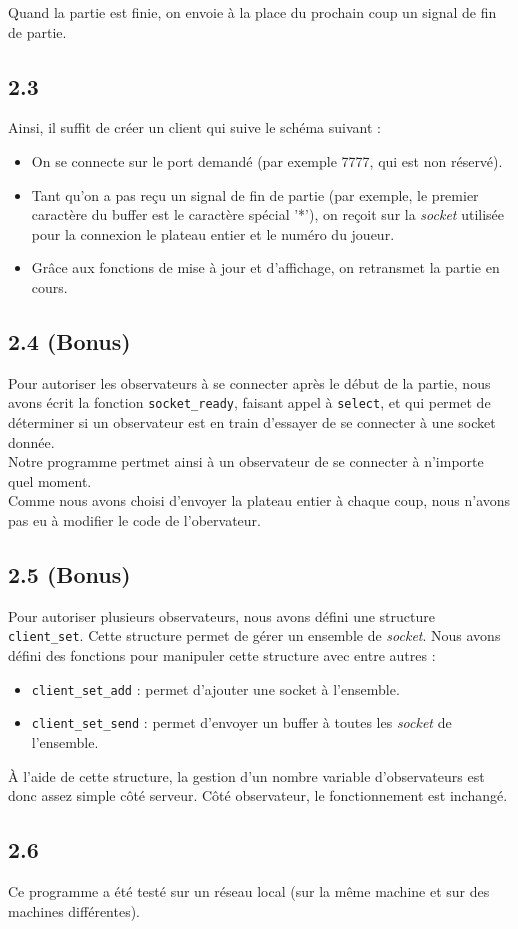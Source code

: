 \documentclass[12pt]{article}
\def\question#1{\subsection{#1}}
\begin{document}
Quand la partie est finie, on envoie à la place du prochain coup un signal de fin de partie.


\question{2.3}
Ainsi, il suffit de créer un client qui suive le schéma suivant :
\begin{itemize}
\item On se connecte sur le port demandé (par exemple 7777, qui est non réservé).
\item Tant qu'on a pas reçu un signal de fin de partie (par exemple, le premier caractère du buffer est le caractère spécial '*'), on reçoit sur la \textit{socket} utilisée pour la connexion le plateau entier et le numéro du joueur.
\item Grâce aux fonctions de mise à jour et d'affichage, on retransmet la partie en cours.
\end{itemize}

  

\question{2.4 (Bonus)}
Pour autoriser les observateurs à se connecter après le début de la partie, nous avons écrit la fonction \texttt{socket\_ready}, faisant appel à \texttt{select}, et qui permet de déterminer si un observateur est en train d'essayer de se connecter à une socket donnée. \\
Notre programme pertmet ainsi à un observateur de se connecter à n'importe quel moment. \\
Comme nous avons choisi d'envoyer la plateau entier à chaque coup, nous n'avons pas eu à modifier le code de l'obervateur.



\question{2.5 (Bonus)}
Pour autoriser plusieurs observateurs, nous avons défini une structure \texttt{client\_set}. Cette structure permet de gérer un ensemble de \textit{socket}. Nous avons défini des fonctions pour manipuler cette structure avec entre autres :
\begin{itemize}
\item \texttt{client\_set\_add} : permet d'ajouter une socket à l'ensemble.
\item \texttt{client\_set\_send} : permet d'envoyer un buffer à toutes les \textit{socket} de l'ensemble.
\end{itemize}
À l'aide de cette structure, la gestion d'un nombre variable d'observateurs est donc assez simple côté serveur. Côté observateur, le fonctionnement est inchangé.



\question{2.6} %

Ce programme a été testé sur un réseau local (sur la même machine et sur des machines différentes).
\end{document}
